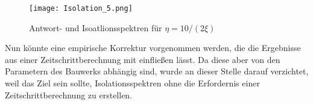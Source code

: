\begin{figure}[H]
    \centering
    \texttt{[image: Isolation\_5.png]}
    \caption{Antwort- und Isoatlionsspektren für $\eta = 10/(2\xi)$}
    \label{fig:Isolation5}
\end{figure}

Nun könnte eine empirische Korrektur vorgenommen werden, die die Ergebnisse aus einer Zeitschrittberechnung mit einfließen lässt. Da diese aber von den Parametern des Bauwerks abhängig sind, wurde an dieser Stelle darauf verzichtet, weil das Ziel sein sollte, Isolationsspektren ohne die Erfordernis einer Zeitschrittberechnung zu erstellen.

\pagebreak